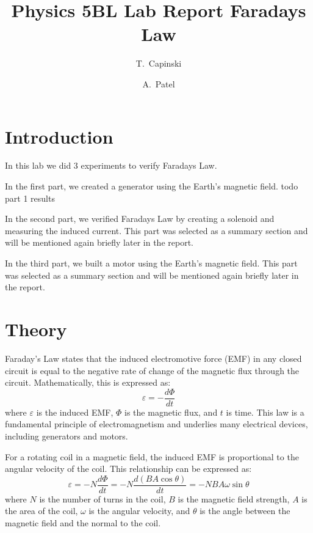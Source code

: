 \documentclass[11pt]{article}
\title{Physics 5BL Lab Report Faradays Law}
\author{T.~Capinski \and A.~Patel}
\let\oldsection\section
\renewcommand\section{\clearpage\oldsection}
\begin{document}
    \maketitle
    \tableofcontents

    \section*{Introduction}\label{sec:introduction}

    In this lab we did 3 experiments to verify Faradays Law. 
    
    In the first part, we created a generator using the Earth's magnetic field. todo part 1 results
    
    In the second part, we verified Faradays Law by creating a solenoid and measuring the induced current. This part was selected as a summary section and will be mentioned again briefly later in the report.
    
    In the third part, we built a motor using the Earth's magnetic field. This part was selected as a summary section and will be mentioned again briefly later in the report.


    \section*{Theory}\label{sec:theory}

    Faraday's Law states that the induced electromotive force (EMF) in any closed circuit is equal to the negative rate of change of the magnetic flux through the circuit.
    Mathematically, this is expressed as:
    \begin{equation}
        \varepsilon = -\frac{d\Phi}{dt}
        \label{eq:faraday}
    \end{equation}
    where $\varepsilon$ is the induced EMF, $\Phi$ is the magnetic flux, and $t$ is time.
    This law is a fundamental principle of electromagnetism and underlies many electrical devices, including generators and motors.

    For a rotating coil in a magnetic field, the induced EMF is proportional to the angular velocity of the coil.
    This relationship can be expressed as:
    \begin{equation}
        \varepsilon = -N\frac{d\Phi}{dt} = -N\frac{d(BA\cos\theta)}{dt} = -NBA\omega\sin\theta
        \label{eq:rotating_coil}
    \end{equation}
    where $N$ is the number of turns in the coil, $B$ is the magnetic field strength, $A$ is the area of the coil, $\omega$ is the angular velocity, and $\theta$ is the angle between the magnetic field and the normal to the coil.
\end{document}
